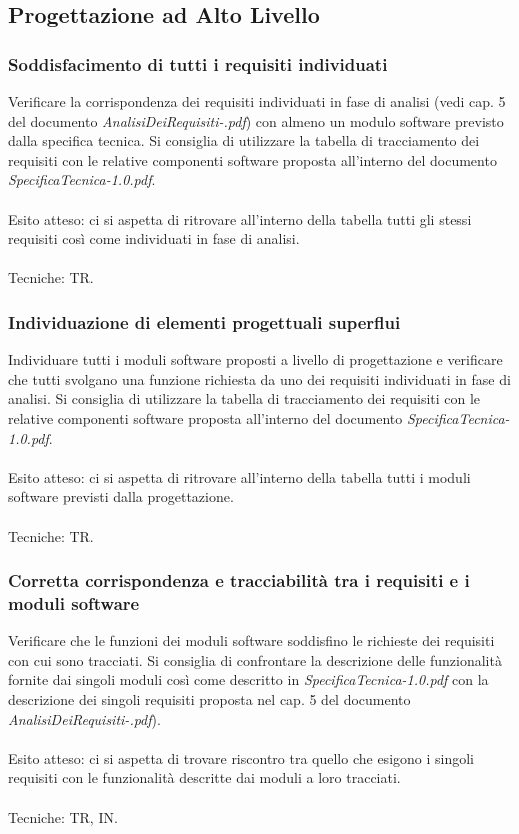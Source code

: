 \subsection{Progettazione ad Alto Livello}

\subsubsection*{Soddisfacimento di tutti i requisiti individuati}

Verificare la corrispondenza dei requisiti individuati in fase di analisi (vedi
cap. 5 del documento \emph{AnalisiDeiRequisiti-\versioneAR.pdf}) con almeno un modulo
software previsto dalla specifica tecnica. Si consiglia di utilizzare la tabella di tracciamento dei requisiti con le relative componenti
software proposta all'interno del documento \emph{SpecificaTecnica-1.0.pdf}.
\\\\
Esito atteso: ci si aspetta di ritrovare all'interno della tabella tutti gli
stessi requisiti cos\`i come individuati in fase di analisi.
\\\\
Tecniche: TR.
\subsubsection*{Individuazione di elementi progettuali superflui}

Individuare tutti i moduli software proposti a livello di progettazione e
verificare che tutti svolgano una funzione richiesta da uno dei requisiti individuati in fase
di analisi. Si consiglia di utilizzare la tabella di tracciamento dei requisiti
con le relative componenti software proposta all'interno del documento
\emph{SpecificaTecnica-1.0.pdf}.
\\\\
Esito atteso: ci si aspetta di ritrovare all'interno della tabella tutti i
moduli software previsti dalla progettazione.
\\\\
Tecniche: TR.

\subsubsection*{Corretta corrispondenza e tracciabilit\`a tra i requisiti e i
moduli software}

Verificare che le funzioni dei moduli software soddisfino le richieste dei
requisiti con cui sono tracciati. Si consiglia di confrontare la descrizione
delle funzionalit\`a fornite dai singoli moduli cos\`i come descritto in
\emph{SpecificaTecnica-1.0.pdf} con la descrizione dei singoli requisiti
proposta nel cap. 5 del documento \emph{AnalisiDeiRequisiti-\versioneAR.pdf}).
\\\\
Esito atteso: ci si aspetta di trovare riscontro tra quello che esigono i
singoli requisiti con le funzionalit\`a descritte dai moduli a loro tracciati.
\\\\
Tecniche: TR, IN.


